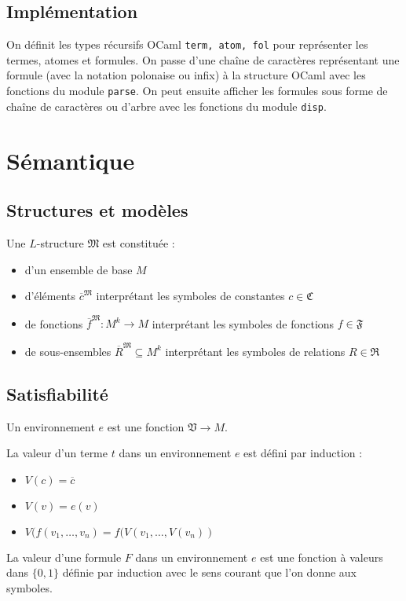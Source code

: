 \documentclass[a4paper]{article}
\begin{document}
\subsection{Implémentation}

On définit les types récursifs OCaml \texttt{term,\ atom,\ fol} pour représenter les termes, atomes et formules. On passe d'une chaîne de caractères représentant une formule (avec la notation polonaise ou infix) à la structure OCaml avec les fonctions du module \texttt{parse}. On peut ensuite afficher les formules sous forme de chaîne de caractères ou d'arbre avec les fonctions du module \texttt{disp}.

\section{Sémantique}

\subsection{Structures et modèles}

\begin{definition}
  Une $L$-structure $\mathfrak{M}$ est constituée :
  \begin{itemize}
  \item d'un ensemble de base $M$
  \item d'éléments $\overline{c}^{\mathfrak{M}}$ interprétant les symboles de constantes $c \in \mathfrak{C}$
  \item de fonctions $\overline{f}^{\mathfrak{M}} : M^k \rightarrow M$ interprétant les symboles de fonctions $f \in \mathfrak{F}$
  \item de sous-ensembles $\overline{R}^{\mathfrak{M}} \subseteq M^k$ interprétant les symboles de relations $R \in \mathfrak{R}$
  \end{itemize}
\end{definition}

\subsection{Satisfiabilité}

\begin{definition}
  Un environnement $e$ est une fonction $\mathfrak{V} \rightarrow M$.

  La valeur d'un terme $t$ dans un environnement $e$ est défini par induction :
  \begin{itemize}
  \item $V(c) = \overline{c}$
  \item $V(v) = e(v)$
  \item $V(f(v_1,\dots,v_n) = f(V(v_1,\dots,V(v_n))$
  \end{itemize}

  La valeur d'une formule $F$ dans un environnement $e$ est une fonction à valeurs dans $\{0,1\}$ définie par induction avec le sens courant que l'on donne aux symboles.
\end{definition}
\end{document}
